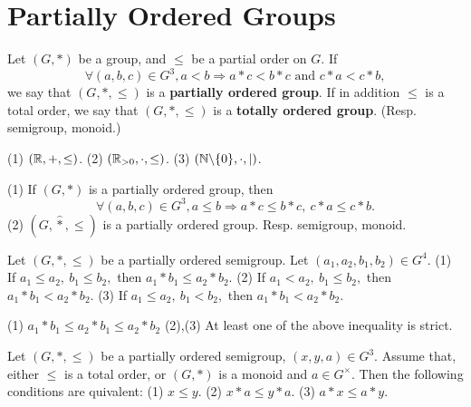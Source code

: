 \section{Partially Ordered Groups}
\begin{definitionenv}
    Let $(G,*)$ be a group, and $\le $ be a partial order on $G$. If 
    $$\forall (a,b,c)\in G^3,a<b\Rightarrow a*c<b*c \text{ and } c*a<c*b,$$
    we say that $(G,*,\le)$ is a \textbf{partially ordered group}. If in addition $\le $ is a total order, we say that $(G,*,\le)$ is a \textbf{totally ordered group}. (Resp. semigroup, monoid.)
\end{definitionenv}
\begin{exampleenv}
    \quad
    (1) $(\mathbb{R},+,\le)$.
    \quad
    (2) $(\mathbb{R}_{>0},\cdot,\le)$.
    \quad
    (3) $(\mathbb{N}\backslash\{0\},\cdot,\mid)$.
\end{exampleenv}
\begin{remark}
    \quad
    \newline
    (1) If $(G,*)$ is a partially ordered group, then 
    $$\forall (a,b,c)\in G^3,a\le b\Rightarrow a*c\le b*c,\ c*a\le c*b.$$
    (2) $(G,\hat{*},\le )$ is a partially ordered group.
    \newline
    Resp. semigroup, monoid.
\end{remark}
\begin{propositionenv}
    \quad\newline
    Let $(G,*,\le)$ be a partially ordered semigroup.  Let $(a_1,a_2,b_1,b_2)\in G^4$. 
    \newline
    (1) If $a_1\le a_2,\ b_1\le b_2,$ then $a_1*b_1\le a_2*b_2.$
    \newline
    (2) If $a_1< a_2,\ b_1\le b_2,$ then $a_1*b_1< a_2*b_2.$
    \newline
    (3) If $a_1\le a_2,\ b_1<b_2,$ then $a_1*b_1< a_2*b_2.$
\end{propositionenv}
\begin{proofenv}
    \quad \newline
    (1) $a_1*b_1\le a_2*b_1\le a_2*b_2$
    \newline
    (2),(3) At least one of the above inequality is strict.
\end{proofenv}
\begin{propositionenv}
    Let $(G,*,\le)$ be a partially ordered semigroup, $(x,y,a)\in G^3$. Assume that, either $\le $ is a total order, or $(G,*)$ is a monoid and $a\in G^\times$. Then the following conditions are quivalent:
    \newline
    (1) $x\le y$.
    \newline
    (2) $x*a\le y*a$.
    \newline
    (3) $a*x\le a*y$.
\end{propositionenv}
